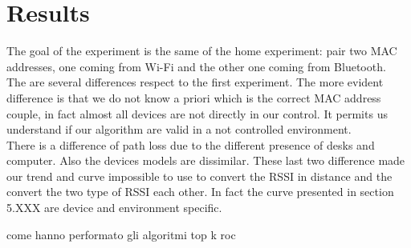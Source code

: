 \section{Results}
The goal of the experiment is the same of the home experiment: pair two MAC addresses, one coming from Wi-Fi and the other one coming from Bluetooth.\\
\linebreak
The are several differences respect to the first experiment. The more evident difference is that we do not know a priori which is the correct MAC address couple, in fact almost all devices are not directly in our control. It permits us understand if our algorithm are valid in a not controlled environment.\\
There is a difference of path loss due to the different presence of desks and computer. Also the devices models are dissimilar. These last two difference made our trend and curve impossible to use to convert the RSSI in distance and the convert the two type of RSSI each other. In fact the curve presented in section 5.XXX are device and environment specific.


come hanno performato gli algoritmi
top k
roc
